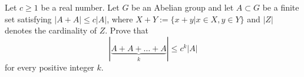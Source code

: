 Let $c \ge 1$ be a real number. Let $G$ be an Abelian group and let $A \subset G$ be a finite set satisfying $|A+A| \le c|A|$, where $X+Y:= \{x+y| x \in X, y \in Y\}$ and $|Z|$ denotes the cardinality of $Z$. Prove that
\[|\underbrace{A+A+\dots+A}_k| \le c^k |A|\]
for every positive integer $k$.

